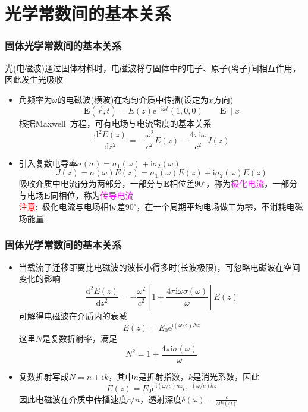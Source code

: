\documentclass[cjk,slidestop,compress,mathserif,blue]{beamer}
\begin{document}
\section{光学常数间的基本关系}
\frame
{
	\frametitle{固体光学常数间的基本关系}
	光(电磁波)通过固体材料时，电磁波将与固体中的电子、原子(离子)间相互作用，因此发生光吸收
	\begin{itemize}
		\item 角频率为$\omega$的电磁波(横波)在均匀介质中传播(设定为$x$方向)
			\begin{displaymath}
				\mathbf{E}(\vec r,t)=E(z)\mathrm{e}^{-\mathrm{i}\omega t}(1,0,0)\qquad\mathbf{E}\parallel x
			\end{displaymath}
			根据\textrm{Maxwell~}方程，可有电场与电流密度的基本关系
			\begin{displaymath}
				\frac{\mathrm{d}^2E(z)}{\mathrm{d}z^2}=-\frac{\omega^2}{c^2}E(z)-\frac{4\pi\mathrm{i}\omega}{c^2}J(z)
			\end{displaymath}
		\item 引入复数电导率$\sigma(\sigma)=\sigma_1(\omega)+\mathrm{i}\sigma_2(\omega)$
			\begin{displaymath}
				J(z)=\sigma(\omega)E(z)=\sigma_1(\omega)E(z)+\mathrm{i}\sigma_2(\omega)E(z)
			\end{displaymath}
			吸收介质中电流$\mathbf{j}$分为两部分，一部分与$\mathbf{E}$相位差$90^{\circ}$，称为\textcolor{magenta}{极化电流}，一部分与电场$\mathbf{E}$同相位，称为\textcolor{magenta}{传导电流}\\
			\textcolor{red}{注意}:~极化电流与电场相位差$90^{\circ}$，在一个周期平均电场做工为零，不消耗电磁场能量
	\end{itemize}
}

\frame
{
	\frametitle{固体光学常数间的基本关系}
	\begin{itemize}
		\item 当载流子迁移距离比电磁波的波长小得多时(长波极限)，可忽略电磁波在空间变化的影响
			\begin{displaymath}
				\frac{\mathrm{d}^2E(z)}{\mathrm{d}z^2}=-\frac{\omega^2}{c^2}\left[ 1+\frac{4\pi\mathrm{i}\omega\sigma(\omega)}{\omega} \right]E(z)
			\end{displaymath}
		可解得电磁波在介质内的衰减
		\begin{displaymath}
			E(z)=E_0\mathrm{e}^{\mathrm{i}(\omega/c)Nz}
		\end{displaymath}
		这里$N$是复数折射率，满足
		\begin{displaymath}
			N^2=1+\frac{4\pi\mathrm{i}\sigma(\omega)}{\omega} 
		\end{displaymath}
		\item 复数折射写成$N=n+\mathrm{i}k$，其中$n$是折射指数，$k$是消光系数，因此
			\begin{displaymath}
				E(z)=E_0\mathrm{e}^{\mathrm{i}(\omega/c)nz}\mathrm{e}^{-(\omega/c)kz}
			\end{displaymath}
			因此电磁波在介质中传播速度$c/n$，透射深度$\delta(\omega)=\frac{c}{\omega k(\omega)}$
	\end{itemize}
}
\end{document}
